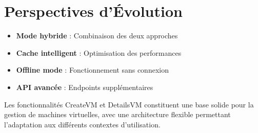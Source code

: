 \documentclass[12pt,a4paper]{report}
\begin{document}
\section{Perspectives d'Évolution}

\begin{itemize}
    \item \textbf{Mode hybride} : Combinaison des deux approches
    \item \textbf{Cache intelligent} : Optimisation des performances
    \item \textbf{Offline mode} : Fonctionnement sans connexion
    \item \textbf{API avancée} : Endpoints supplémentaires
\end{itemize}

\begin{successbox}
Les fonctionnalités CreateVM et DetailsVM constituent une base solide pour la gestion de machines virtuelles, avec une architecture flexible permettant l'adaptation aux différents contextes d'utilisation.
\end{successbox}
\end{document}

